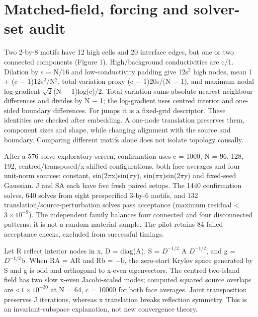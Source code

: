 \documentclass[10pt]{article}
\begin{document}
\section{Matched-field, forcing and solver-set audit}
Two 2-by-8 motifs have 12 high cells and 20 interface edges, but one or two connected components (Figure 1). High/background conductivities are c/1. Dilation by s = N/16 and low-conductivity padding give 12s\ensuremath{^{2}} high nodes, mean 1 + (c \ensuremath{-} 1)12s\ensuremath{^{2}}/N\ensuremath{^{2}}, total-variation proxy (c \ensuremath{-} 1)20s/(N \ensuremath{-} 1), and maximum nodal log-gradient \ensuremath{\sqrt{2}}(N \ensuremath{-} 1)log(c)/2. Total variation sums absolute nearest-neighbour differences and divides by N \ensuremath{-} 1; the log-gradient uses centred interior and one-sided boundary differences. For jumps it is a fixed-grid descriptor. These identities are checked after embedding. A one-node translation preserves them, component sizes and shape, while changing alignment with the source and boundary. Comparing different motifs alone does not isolate topology causally.\par
After a 576-solve exploratory screen, confirmation uses c = 1000, N = 96, 128, 192, centred/\allowbreak{}transposed/\allowbreak{}x-shifted configurations, both face averages and four unit-norm sources: constant, sin(2\ensuremath{\pi}x)sin(\ensuremath{\pi}y), sin(\ensuremath{\pi}x)sin(2\ensuremath{\pi}y) and fixed-seed Gaussian. J and SA each have five fresh paired setups. The 1440 confirmation solves, 640 solves from eight prespecified 3-by-6 motifs, and 132 translation/source-perturbation solves pass acceptance (maximum residual <\ensuremath{3\times10^{-9}}). The independent family balances four connected and four disconnected patterns; it is not a random material sample. The pilot retains 84 failed acceptance checks, excluded from successful timings.\par
Let R reflect interior nodes in x, D = diag(A), S = \ensuremath{D^{-1/2}} A \ensuremath{D^{-1/2}}, and g = \ensuremath{D^{-1/2}}b. When RA = AR and Rb = \ensuremath{-}b, the zero-start Krylov space generated by S and g is odd and orthogonal to x-even eigenvectors. The centred two-island field has two slow x-even Jacobi-scaled modes; computed squared source overlaps are <\ensuremath{1\times10^{-30}} at N = 64, c = 10000 for both face averages. Joint transposition preserves J iterations, whereas x translation breaks reflection symmetry. This is an invariant-subspace explanation, not new convergence theory.\par
\end{document}
